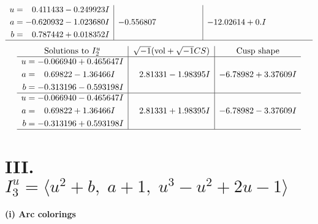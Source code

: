 \documentclass[1p]{elsarticle_modified}
\theoremstyle{definition}
\newcommand{\I}{\sqrt{-1}}
\begin{document}
$$\begin{array}{c|c|c}
\begin{aligned}
u &= \phantom{-}0.411433 - 0.249923 I \\
a &= -0.620932 - 1.023680 I \\
b &= \phantom{-}0.787442 + 0.018352 I\end{aligned}
 & -0.556807\phantom{ +0.000000I} & -12.02614 + 0. I\phantom{ +0.000000I}\\
 \hline 
 \end{array}$$\newpage$$\begin{array}{c|c|c}  
\text{Solutions to }I^u_{2}& \I (\text{vol} + \sqrt{-1}CS) & \text{Cusp shape}\\
 \hline 
\begin{aligned}
u &= -0.066940 + 0.465647 I \\
a &= \phantom{-}0.69822 - 1.36466 I \\
b &= -0.313196 - 0.593198 I\end{aligned}
 & \phantom{-}2.81331 - 1.98395 I & -6.78982 + 3.37609 I \\ \hline\begin{aligned}
u &= -0.066940 - 0.465647 I \\
a &= \phantom{-}0.69822 + 1.36466 I \\
b &= -0.313196 + 0.593198 I\end{aligned}
 & \phantom{-}2.81331 + 1.98395 I & -6.78982 - 3.37609 I\\
 \hline 
 \end{array}$$\newpage\newpage\renewcommand{\arraystretch}{1}
\centering \section*{III. $I^u_{3}= \langle u^2+b,\;a+1,\;u^3- u^2+2 u-1 \rangle$}
\flushleft \textbf{(i) Arc colorings}\\
\end{document}
